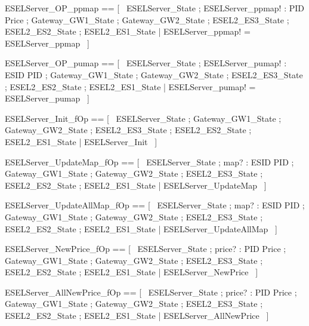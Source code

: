 \documentclass{article}
\begin{document}
\begin{zed}
	ESELServer\_OP\_ppmap == [~  \Xi ESELServer\_State ; ESELServer\_ppmap! : PID \pfun Price ; \Xi Gateway\_GW1\_State ; \Xi Gateway\_GW2\_State ; \Xi ESEL2\_ES3\_State ; \Xi ESEL2\_ES2\_State ; \Xi ESEL2\_ES1\_State | ESELServer\_ppmap! = ESELServer\_ppmap  ~]
\end{zed}

\begin{zed}
	ESELServer\_OP\_pumap == [~  \Xi ESELServer\_State ; ESELServer\_pumap! : ESID \pfun PID ; \Xi Gateway\_GW1\_State ; \Xi Gateway\_GW2\_State ; \Xi ESEL2\_ES3\_State ; \Xi ESEL2\_ES2\_State ; \Xi ESEL2\_ES1\_State | ESELServer\_pumap! = ESELServer\_pumap  ~]
\end{zed}

\begin{zed}
	ESELServer\_Init\_fOp == [~  \Xi ESELServer\_State ; \Xi Gateway\_GW1\_State ; \Xi Gateway\_GW2\_State ; \Xi ESEL2\_ES3\_State ; \Xi ESEL2\_ES2\_State ; \Xi ESEL2\_ES1\_State | \lnot \pre ESELServer\_Init  ~]
\end{zed}

\begin{zed}
	ESELServer\_UpdateMap\_fOp == [~  \Xi ESELServer\_State ; map? : ESID \pfun PID ; \Xi Gateway\_GW1\_State ; \Xi Gateway\_GW2\_State ; \Xi ESEL2\_ES3\_State ; \Xi ESEL2\_ES2\_State ; \Xi ESEL2\_ES1\_State | \lnot \pre ESELServer\_UpdateMap  ~]
\end{zed}

\begin{zed}
	ESELServer\_UpdateAllMap\_fOp == [~  \Xi ESELServer\_State ; map? : ESID \pfun PID ; \Xi Gateway\_GW1\_State ; \Xi Gateway\_GW2\_State ; \Xi ESEL2\_ES3\_State ; \Xi ESEL2\_ES2\_State ; \Xi ESEL2\_ES1\_State | \lnot \pre ESELServer\_UpdateAllMap  ~]
\end{zed}

\begin{zed}
	ESELServer\_NewPrice\_fOp == [~  \Xi ESELServer\_State ; price? : PID \pfun Price ; \Xi Gateway\_GW1\_State ; \Xi Gateway\_GW2\_State ; \Xi ESEL2\_ES3\_State ; \Xi ESEL2\_ES2\_State ; \Xi ESEL2\_ES1\_State | \lnot \pre ESELServer\_NewPrice  ~]
\end{zed}

\begin{zed}
	ESELServer\_AllNewPrice\_fOp == [~  \Xi ESELServer\_State ; price? : PID \pfun Price ; \Xi Gateway\_GW1\_State ; \Xi Gateway\_GW2\_State ; \Xi ESEL2\_ES3\_State ; \Xi ESEL2\_ES2\_State ; \Xi ESEL2\_ES1\_State | \lnot \pre ESELServer\_AllNewPrice  ~]
\end{zed}
\end{document}
